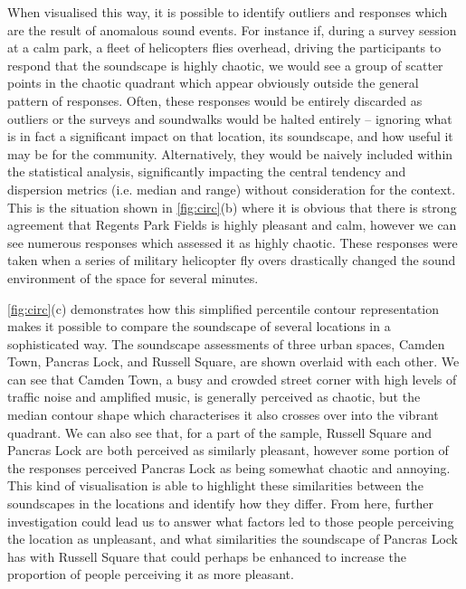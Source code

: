 When visualised this way, it is possible to identify outliers and responses which are the result of anomalous sound events. For instance if, during a survey session at a calm park, a fleet of helicopters flies overhead, driving the participants to respond that the soundscape is highly chaotic, we would see a group of scatter points in the chaotic quadrant which appear obviously outside the general pattern of responses. Often, these responses would be entirely discarded as outliers or the surveys and soundwalks would be halted entirely -- ignoring what is in fact a significant impact on that location, its soundscape, and how useful it may be for the community. Alternatively, they would be naively included within the statistical analysis, significantly impacting the central tendency and dispersion metrics (i.e. median and range) without consideration for the context. This is the situation shown in \cref{fig:circ}(b) where it is obvious that there is strong agreement that Regents Park Fields is highly pleasant and calm, however we can see numerous responses which assessed it as highly chaotic. These responses were taken when a series of military helicopter fly overs drastically changed the sound environment of the space for several minutes.

\cref{fig:circ}(c) demonstrates how this simplified  percentile contour representation makes it possible to compare the soundscape of several locations in a sophisticated way. The soundscape assessments of three urban spaces, Camden Town, Pancras Lock, and Russell Square, are shown overlaid with each other. We can see that Camden Town, a busy and crowded street corner with high levels of traffic noise and amplified music, is generally perceived as chaotic, but the median contour shape which characterises it also crosses over into the vibrant quadrant. We can also see that, for a part of the sample, Russell Square and Pancras Lock are both perceived as similarly pleasant, however some portion of the responses perceived Pancras Lock as being somewhat chaotic and annoying. This kind of visualisation is able to highlight these similarities between the soundscapes in the locations and identify how they differ. From here, further investigation could lead us to answer what factors led to those people perceiving the location as unpleasant, and what similarities the soundscape of Pancras Lock has with Russell Square that could perhaps be enhanced to increase the proportion of people perceiving it as more pleasant.

